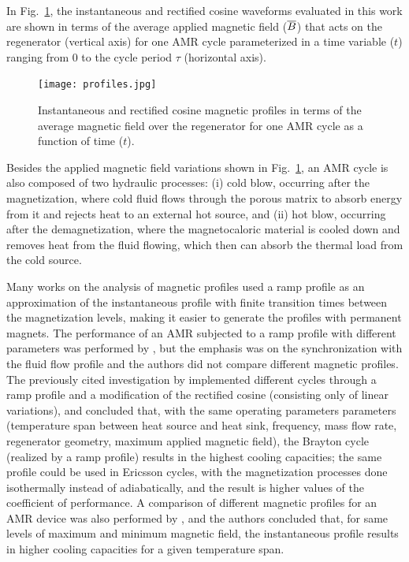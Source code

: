 \documentclass[draft]{svjour3}
\begin{document}
In Fig.~\ref{fig:cycles}, the instantaneous and rectified cosine waveforms evaluated in this work are shown in terms of the average applied magnetic field ($\overline{B}$) that acts on the regenerator (vertical axis) for one AMR cycle parameterized in a time variable ($t$) ranging from 0 to the cycle period $\tau$ (horizontal axis).  

\begin{figure}[!ht]
  \centering
  \texttt{[image: profiles.jpg]}
  \caption{Instantaneous and rectified cosine magnetic profiles in terms of the average magnetic field over the regenerator for one AMR cycle as a function of time ($t$). }
  \label{fig:cycles}
\end{figure}

Besides the applied magnetic field variations shown in Fig.~\ref{fig:cycles}, an AMR cycle is also composed of two hydraulic processes: (i) cold blow, occurring after the magnetization, where cold fluid flows through the porous matrix to absorb energy from it and rejects heat to an external hot source, and (ii) hot blow, occurring after the demagnetization, where the magnetocaloric material is cooled down and removes heat from the fluid flowing, which then can absorb the thermal load from the cold source.

Many works on the analysis of  magnetic profiles used a ramp profile as  an approximation of the instantaneous profile with finite transition times between the magnetization levels, making it easier to generate the profiles with permanent magnets. The performance of an AMR subjected to a ramp profile with different parameters was performed by \cite{bib:bjoerk11_amr}, but the emphasis was on the synchronization with the fluid flow profile and the authors did not compare different magnetic profiles. The previously cited investigation by \cite{bib:kitanovski} implemented different cycles through a ramp profile and a modification of the rectified cosine (consisting only of linear variations), and concluded that, with the same operating parameters parameters (temperature span between heat source and heat sink, frequency, mass flow rate, regenerator geometry, maximum applied magnetic field), the Brayton cycle (realized by a ramp profile) results in the highest cooling capacities; the same profile could be used in Ericsson cycles, with the magnetization processes done isothermally instead of adiabatically, and the result is higher values of the coefficient of performance. A comparison of different magnetic profiles for an AMR device was also performed by \cite{bib:asme-mce}, and  the authors concluded that, for same levels of maximum and minimum magnetic field, the instantaneous profile results in higher cooling capacities for a given temperature span.
\end{document}
